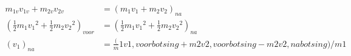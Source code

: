 \documentclass[12pt,a4paper]{article}
\begin{document}
	\begin{equation}
		\begin{aligned}
			m_{1v}v_{1v} + m_{2v}v_{2v} &= (m_1v_1 + m_2v_2)_{na} \\
			(\tfrac{1}{2}m_1{v_1}^2 + \tfrac{1}{2}m_2{v_2}^2)_{voor} &= (\tfrac{1}{2}m_1{v_1}^2 + \tfrac{1}{2}m_2{v_2}^2)_{na} \\
			(v_1)_{na} &= \frac{(}m1v1,voor botsing + m2v2, voor botsing - m2v2, na botsing) / m1
		\end{aligned}
	\end{equation}
\end{document}
